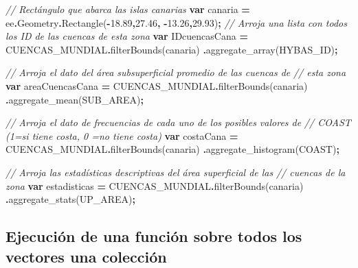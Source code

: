 \documentclass[
  12pt,
  letterpaper,
  twoside]{book}
\newenvironment{Shaded}{\begin{snugshade}}{\end{snugshade}}
\newcommand{\AttributeTok}[1]{\textcolor[rgb]{0.77,0.63,0.00}{#1}}
\newcommand{\CommentTok}[1]{\textcolor[rgb]{0.56,0.35,0.01}{\textit{#1}}}
\newcommand{\FloatTok}[1]{\textcolor[rgb]{0.00,0.00,0.81}{#1}}
\newcommand{\FunctionTok}[1]{\textcolor[rgb]{0.00,0.00,0.00}{#1}}
\newcommand{\KeywordTok}[1]{\textcolor[rgb]{0.13,0.29,0.53}{\textbf{#1}}}
\newcommand{\NormalTok}[1]{#1}
\newcommand{\OperatorTok}[1]{\textcolor[rgb]{0.81,0.36,0.00}{\textbf{#1}}}
\newcommand{\StringTok}[1]{\textcolor[rgb]{0.31,0.60,0.02}{#1}}
\begin{document}
\begin{Shaded}
\begin{Highlighting}[]
\CommentTok{// Rectángulo que abarca las islas canarias}
\KeywordTok{var}\NormalTok{ canaria }\OperatorTok{=}\NormalTok{ ee}\OperatorTok{.}\AttributeTok{Geometry}\OperatorTok{.}\FunctionTok{Rectangle}\NormalTok{(}\OperatorTok{{-}}\FloatTok{18.89}\OperatorTok{,}\FloatTok{27.46}\OperatorTok{,} \OperatorTok{{-}}\FloatTok{13.26}\OperatorTok{,}\FloatTok{29.93}\NormalTok{)}\OperatorTok{;} 
\CommentTok{// Arroja una lista con todos los ID de las cuencas de esta zona}
\KeywordTok{var}\NormalTok{ IDcuencasCana }\OperatorTok{=}\NormalTok{ CUENCAS\_MUNDIAL}\OperatorTok{.}\FunctionTok{filterBounds}\NormalTok{(canaria)}
\OperatorTok{.}\FunctionTok{aggregate\_array}\NormalTok{(}\StringTok{\textquotesingle{}HYBAS\_ID\textquotesingle{}}\NormalTok{)}\OperatorTok{;}

\CommentTok{// Arroja el dato del área subsuperficial promedio de las cuencas de }
\CommentTok{// esta zona}
\KeywordTok{var}\NormalTok{ areaCuencasCana }\OperatorTok{=}\NormalTok{ CUENCAS\_MUNDIAL}\OperatorTok{.}\FunctionTok{filterBounds}\NormalTok{(canaria)}
\OperatorTok{.}\FunctionTok{aggregate\_mean}\NormalTok{(}\StringTok{\textquotesingle{}SUB\_AREA\textquotesingle{}}\NormalTok{)}\OperatorTok{;}

\CommentTok{// Arroja el dato de frecuencias de cada uno de los posibles valores de}
\CommentTok{// COAST (1=si tiene costa, 0 =no tiene costa)}
\KeywordTok{var}\NormalTok{ costaCana }\OperatorTok{=}\NormalTok{ CUENCAS\_MUNDIAL}\OperatorTok{.}\FunctionTok{filterBounds}\NormalTok{(canaria)}
\OperatorTok{.}\FunctionTok{aggregate\_histogram}\NormalTok{(}\StringTok{\textquotesingle{}COAST\textquotesingle{}}\NormalTok{)}\OperatorTok{;} 

\CommentTok{// Arroja las estadísticas descriptivas del área superficial de las}
\CommentTok{// cuencas de la zona}
\KeywordTok{var}\NormalTok{ estadisticas }\OperatorTok{=}\NormalTok{ CUENCAS\_MUNDIAL}\OperatorTok{.}\FunctionTok{filterBounds}\NormalTok{(canaria)}
\OperatorTok{.}\FunctionTok{aggregate\_stats}\NormalTok{(}\StringTok{\textquotesingle{}UP\_AREA\textquotesingle{}}\NormalTok{)}\OperatorTok{;} 
\end{Highlighting}
\end{Shaded}

\hypertarget{ejecuciuxf3n-de-una-funciuxf3n-sobre-todos-los-vectores-una-colecciuxf3n}{%
\subsection*{Ejecución de una función sobre todos los vectores una colección}\label{ejecuciuxf3n-de-una-funciuxf3n-sobre-todos-los-vectores-una-colecciuxf3n}}
\end{document}
